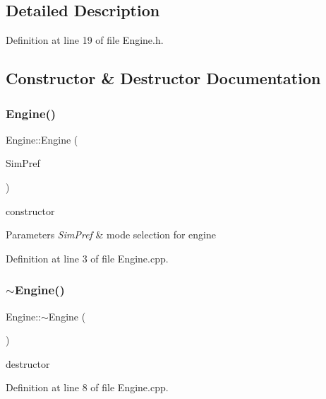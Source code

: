 \subsection{Detailed Description}


Definition at line 19 of file Engine.\+h.



\subsection{Constructor \& Destructor Documentation}
\mbox{\label{class_engine_ae305df3b4dd35fb05faa6a706155dcba}} 
\subsubsection{\texorpdfstring{Engine()}{Engine()}}
{\footnotesize\ttfamily Engine\+::\+Engine (\begin{DoxyParamCaption}\item[{Sim\+D\+Preference \&}]{Sim\+Pref }\end{DoxyParamCaption})}



constructor 


\begin{DoxyParams}{Parameters}
{\em Sim\+Pref} & mode selection for engine \\
\hline
\end{DoxyParams}


Definition at line 3 of file Engine.\+cpp.

\mbox{\label{class_engine_a8ef7030a089ecb30bbfcb9e43094717a}} 
\subsubsection{\texorpdfstring{$\sim$\+Engine()}{~Engine()}}
{\footnotesize\ttfamily Engine\+::$\sim$\+Engine (\begin{DoxyParamCaption}{ }\end{DoxyParamCaption})}



destructor 



Definition at line 8 of file Engine.\+cpp.



